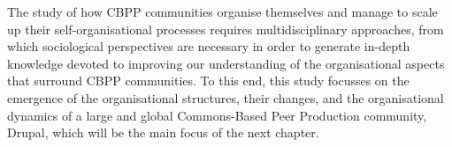 The study of how CBPP communities organise themselves and manage to scale up their self-organisational processes requires multidisciplinary approaches, from which sociological perspectives are necessary in order to generate in-depth knowledge devoted to improving our understanding of the organisational aspects that surround CBPP communities. To this end, this study focusses on the emergence of the organisational structures, their changes, and the organisational dynamics of a large and global Commons-Based Peer Production community, Drupal, which will be the main focus of the next chapter.